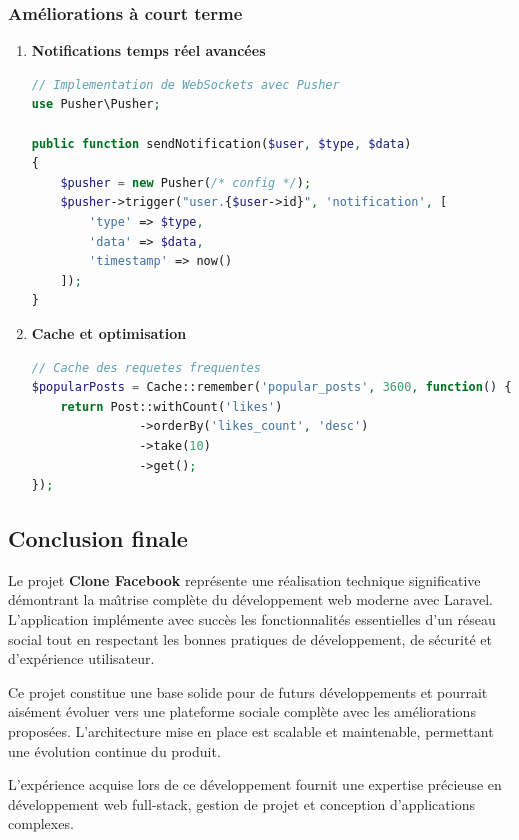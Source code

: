 \documentclass[12pt,a4paper]{article}
\begin{document}
\subsubsection{Am\'eliorations \`a court terme}

\begin{enumerate}
    \item \textbf{Notifications temps r\'eel avanc\'ees}
    \begin{lstlisting}[language=PHP]
// Implementation de WebSockets avec Pusher
use Pusher\Pusher;

public function sendNotification($user, $type, $data)
{
    $pusher = new Pusher(/* config */);
    $pusher->trigger("user.{$user->id}", 'notification', [
        'type' => $type,
        'data' => $data,
        'timestamp' => now()
    ]);
}
    \end{lstlisting}

    \item \textbf{Cache et optimisation}
    \begin{lstlisting}[language=PHP]
// Cache des requetes frequentes
$popularPosts = Cache::remember('popular_posts', 3600, function() {
    return Post::withCount('likes')
               ->orderBy('likes_count', 'desc')
               ->take(10)
               ->get();
});
    \end{lstlisting}
\end{enumerate}

\subsection{Conclusion finale}

Le projet \textbf{Clone Facebook} repr\'esente une r\'ealisation technique significative d\'emontrant la ma\^{\i}trise compl\`ete du d\'eveloppement web moderne avec Laravel. L'application impl\'emente avec succ\`es les fonctionnalit\'es essentielles d'un r\'eseau social tout en respectant les bonnes pratiques de d\'eveloppement, de s\'ecurit\'e et d'exp\'erience utilisateur.

Ce projet constitue une base solide pour de futurs d\'eveloppements et pourrait ais\'ement \'evoluer vers une plateforme sociale compl\`ete avec les am\'eliorations propos\'ees. L'architecture mise en place est scalable et maintenable, permettant une \'evolution continue du produit.

L'exp\'erience acquise lors de ce d\'eveloppement fournit une expertise pr\'ecieuse en d\'eveloppement web full-stack, gestion de projet et conception d'applications complexes.
\end{document}
